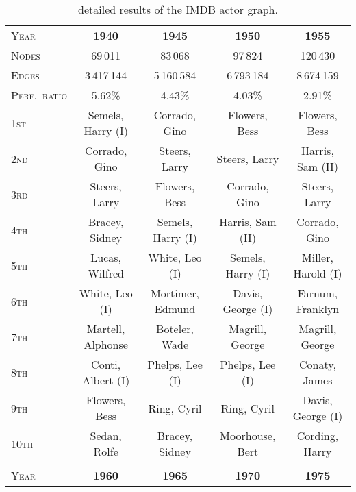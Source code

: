 \documentclass{acm_proc_article-sp}
\begin{document}
\begin{small}
\begin{table*}[b]
\caption{detailed results of the IMDB actor graph.}
\label{tab:imdb}
\centering
\begin{tabular}{|l|c|c|c|c|}
\hline
\textsc{Year} & \textbf{1940} & \textbf{1945} & \textbf{1950} & \textbf{1955}\\ 
\textsc{Nodes} & 69\,011 & 83\,068 & 97\,824 & 120\,430\\ 
\textsc{Edges} & 3\,417\,144 & 5\,160\,584 & 6\,793\,184 & 8\,674\,159\\ 
\textsc{Perf.~ratio} & 5.62\% & 4.43\% & 4.03\% & 2.91\%\\ 
\hline
\textsc{1st} &           Semels, Harry (I)  &               Corrado, Gino  &               Flowers, Bess  &               Flowers, Bess \\ 
\textsc{2nd} &               Corrado, Gino  &               Steers, Larry  &               Steers, Larry  &            Harris, Sam (II) \\ 
\textsc{3rd} &               Steers, Larry  &               Flowers, Bess  &               Corrado, Gino  &               Steers, Larry \\ 
\textsc{4th} &              Bracey, Sidney  &           Semels, Harry (I)  &            Harris, Sam (II)  &               Corrado, Gino \\ 
\textsc{5th} &              Lucas, Wilfred  &              White, Leo (I)  &           Semels, Harry (I)  &          Miller, Harold (I) \\ 
\textsc{6th} &              White, Leo (I)  &            Mortimer, Edmund  &           Davis, George (I)  &            Farnum, Franklyn \\ 
\textsc{7th} &           Martell, Alphonse  &               Boteler, Wade  &             Magrill, George  &             Magrill, George \\ 
\textsc{8th} &           Conti, Albert (I)  &             Phelps, Lee (I)  &             Phelps, Lee (I)  &               Conaty, James \\ 
\textsc{9th} &               Flowers, Bess  &                 Ring, Cyril  &                 Ring, Cyril  &           Davis, George (I) \\ 
\textsc{10th} &                 Sedan, Rolfe  &               Bracey, Sidney  &              Moorhouse, Bert  &               Cording, Harry \\ 
\hline
\multicolumn{5}{c}{} \\ 
\hline
\textsc{Year} & \textbf{1960} & \textbf{1965} & \textbf{1970} & \textbf{1975}\\ 

\end{tabular}
\end{table*}
\end{small}
\end{document}
